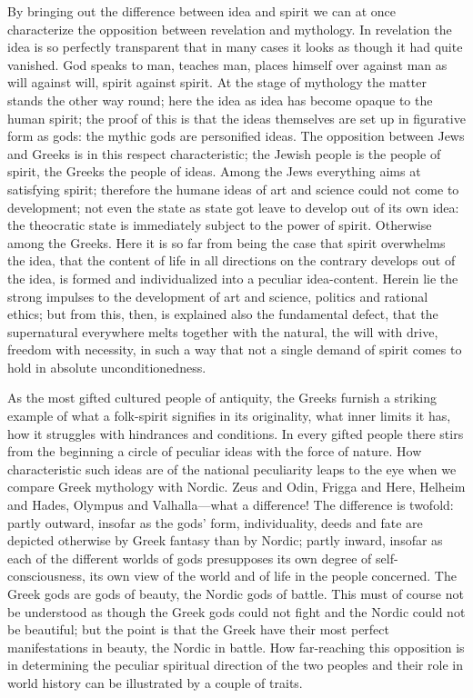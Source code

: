 \documentclass[12pt]{book}
\newcommand{\opage}[1]{\marginnote{\footnotesize\textit{[#1]}}}
\begin{document}
By bringing out the difference between idea and spirit we can at once
characterize the opposition between revelation and mythology. In
revelation the idea is so perfectly transparent that in many cases it
looks as though it had quite vanished. God speaks to man, teaches man,
places himself over against man as will against will, spirit against
spirit. At the stage of mythology the matter stands the other way
round; here the idea as idea has become opaque to the human spirit; the
proof of this is that the ideas themselves are set up in figurative
form as gods: the mythic gods
\opage{21}\setcounter{footnote}{0}%
are personified ideas. The opposition between Jews and Greeks is in
this respect characteristic; the Jewish people is the people of spirit,
the Greeks the people of ideas. Among the Jews everything aims at
satisfying spirit; therefore the humane ideas of art and science could
not come to development; not even the state as state got leave to
develop out of its own idea: the theocratic state is immediately
subject to the power of spirit. Otherwise among the Greeks. Here it is
so far from being the case that spirit overwhelms the idea, that the
content of life in all directions
on the contrary develops out of the idea, is formed and individualized
into a peculiar idea-content. Herein lie the strong impulses to the
development of art and science, politics and rational ethics; but from
this, then, is explained also the fundamental defect, that the
supernatural everywhere melts together with the natural, the will with
drive, freedom with necessity, in such a way that not a single demand
of spirit comes to hold in absolute unconditionedness.

As the most gifted cultured people of antiquity, the Greeks furnish a
striking example of what a folk-spirit signifies in its originality,
what inner limits it has, how it struggles with hindrances and
conditions. In every gifted people there stirs from the beginning a
circle of peculiar ideas with the force of nature. How characteristic
such ideas are of the national peculiarity leaps to the eye when we
compare Greek mythology with Nordic. Zeus and Odin, Frigga and Here,
Helheim and Hades, Olympus and Valhalla---what a difference! The
difference is twofold: partly outward, insofar as the gods' form,
individuality, deeds and fate are depicted otherwise by Greek fantasy
than by Nordic; partly inward, insofar as each of the different worlds
of gods
\opage{22}\setcounter{footnote}{0}%
presupposes its own degree of self-consciousness, its own view of the
world and of life in the people concerned. The Greek gods are gods of
beauty, the Nordic gods of battle. This must of course not be
understood as though the Greek gods could not fight and the Nordic
could not be beautiful; but the point is that the Greek have their most
perfect manifestations in beauty, the Nordic in battle. How far-reaching
this opposition is in determining the peculiar spiritual direction of
the two peoples and their role in world history can be illustrated by a
couple of traits.
\end{document}
